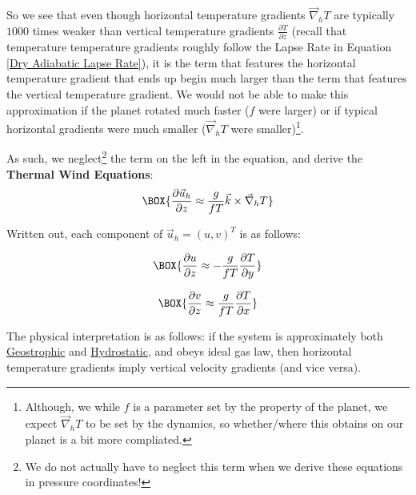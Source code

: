 So we see that even though horizontal temperature gradients $\vec{\nabla}_h T$ are typically $1000$ times weaker than vertical temperature gradients $\frac{\partial T}{\partial z}$ (recall that temperature temperature gradients roughly follow the Lapse Rate in Equation \ref{Dry Adiabatic Lapse Rate}), it is the term that features the horizontal temperature gradient that ends up begin much larger than the term that features the vertical temperature gradient. We would not be able to make this approximation if the planet rotated much faster ($f$ were larger) or if typical horizontal gradients were much smaller ($\vec{\nabla}_h T$ were smaller)\footnote{Although, we while $f$ is a parameter set by the property of the planet, we expect $\vec{\nabla}_h T$ to be set by the dynamics, so whether/where this obtains on our planet is a bit more compliated.}.

As such, we neglect\footnote{
    We do not actually have to neglect this term when we derive these equations in pressure coordinates!
} the term on the left in the equation, and derive the \textbf{Thermal Wind Equations}:
\begin{align}\label{Thermal Wind}
    \BOX{\frac{\partial\vec{u}_h}{\partial z}\approx\frac{g}{fT}\vec{k}\times\vec{\nabla}_hT}
\end{align}

Written out, each component of $\vec{u}_h=(u,v)^T$ is as follows:

\begin{minipage}{0.45\linewidth}
    \begin{align}
        \label{u Thermal}
        \BOX{\frac{\partial u}{\partial z} \approx-\frac{g}{f T}\frac{\partial T}{\partial y}}
    \end{align}
\end{minipage}
\hfill
\begin{minipage}{0.45\linewidth}
    \begin{align}
        \label{v Thermal}
        \BOX{\frac{\partial v}{\partial z} \approx \frac{g}{f T}\frac{\partial T}{\partial x}}
    \end{align}
\end{minipage}

The physical interpretation is as follows: if the system is approximately both \hyperref[Geostrophic Box]{Geostrophic} and \hyperref[Hydrostatic GFD Box]{Hydrostatic}, and obeys ideal gas law, then horizontal temperature gradients imply vertical velocity gradients (and vice versa).

